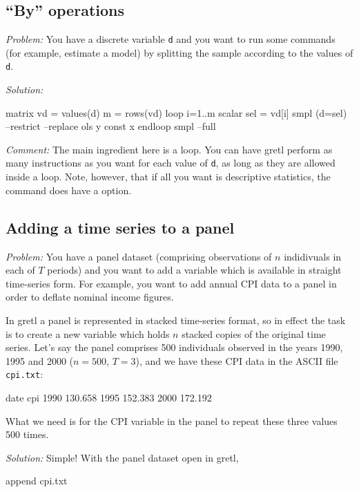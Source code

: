 \subsection{``By'' operations}

\emph{Problem:} You have a discrete variable \texttt{d} and you want
to run some commands (for example, estimate a model) by splitting the
sample according to the values of \texttt{d}.

\emph{Solution:}
\begin{code}
matrix vd = values(d)
m = rows(vd)
loop i=1..m
  scalar sel = vd[i]
  smpl (d=sel) --restrict --replace
  ols y const x
endloop
smpl --full
\end{code}

\emph{Comment:} The main ingredient here is a loop.  You can have
gretl perform as many instructions as you want for each value of
\texttt{d}, as long as they are allowed inside a loop. Note, however,
that if all you want is descriptive statistics, the 
command does have a  option.

\subsection{Adding a time series to a panel}

\emph{Problem:} You have a panel dataset (comprising observations of
$n$ indidivuals in each of $T$ periods) and you want to add a variable
which is available in straight time-series form.  For example, you
want to add annual CPI data to a panel in order to deflate nominal
income figures.

In gretl a panel is represented in stacked time-series format, so in
effect the task is to create a new variable which holds $n$ stacked
copies of the original time series.  Let's say the panel comprises 500
individuals observed in the years 1990, 1995 and 2000 ($n=500$,
$T=3$), and we have these CPI data in the ASCII file \texttt{cpi.txt}:

\begin{code}
date cpi
1990 130.658
1995 152.383
2000 172.192
\end{code}

What we need is for the CPI variable in the panel to repeat these
three values 500 times.

\emph{Solution:} Simple!  With the panel dataset open in gretl,
\begin{code}
append cpi.txt
\end{code}

